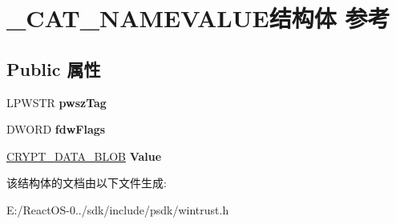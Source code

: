\hypertarget{struct___c_a_t___n_a_m_e_v_a_l_u_e}{}\section{\+\_\+\+C\+A\+T\+\_\+\+N\+A\+M\+E\+V\+A\+L\+U\+E结构体 参考}
\label{struct___c_a_t___n_a_m_e_v_a_l_u_e}
\subsection*{Public 属性}
\begin{DoxyCompactItemize}
\item 
\mbox{\label{struct___c_a_t___n_a_m_e_v_a_l_u_e_a7688de3f47fbde762ffad91e00c954c3}} 
L\+P\+W\+S\+TR {\bfseries pwsz\+Tag}
\item 
\mbox{\label{struct___c_a_t___n_a_m_e_v_a_l_u_e_ab56a70a127109829b2cffb65c79fed50}} 
D\+W\+O\+RD {\bfseries fdw\+Flags}
\item 
\mbox{\label{struct___c_a_t___n_a_m_e_v_a_l_u_e_aa7ec8d5cf6b7ef6a8b835f95a0c3c42e}} 
\hyperlink{struct___c_r_y_p_t_o_a_p_i___b_l_o_b}{C\+R\+Y\+P\+T\+\_\+\+D\+A\+T\+A\+\_\+\+B\+L\+OB} {\bfseries Value}
\end{DoxyCompactItemize}


该结构体的文档由以下文件生成\+:\begin{DoxyCompactItemize}
\item 
E\+:/\+React\+O\+S-\/0../sdk/include/psdk/wintrust.\+h\end{DoxyCompactItemize}
